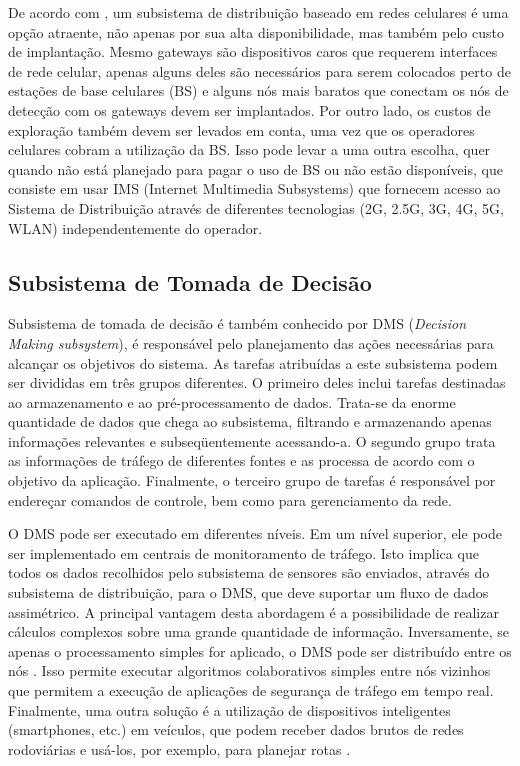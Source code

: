 \documentclass[
	12pt,				%
	oneside,			%
	a4paper,			%
	english,			%
	brazil				%
	]{abntex2ppgsi}
\begin{document}
De acordo com , um subsistema de distribuição baseado em redes celulares é uma opção atraente, não apenas por sua alta disponibilidade, mas também pelo custo de implantação. Mesmo gateways são dispositivos caros que requerem interfaces de rede celular, apenas alguns deles são necessários para serem colocados perto de estações de base celulares (BS) e alguns nós mais baratos que conectam os nós de detecção com os gateways devem ser implantados. Por outro lado, os custos de exploração também devem ser levados em conta, uma vez que os operadores celulares cobram a utilização da BS. Isso pode levar a uma outra escolha, quer quando não está planejado para pagar o uso de BS ou não estão disponíveis, que consiste em usar IMS (Internet Multimedia Subsystems) \cite{birk2009iroad} que fornecem acesso ao Sistema de Distribuição através de diferentes tecnologias (2G, 2.5G, 3G, 4G, 5G, WLAN) independentemente do operador.

\subsection{Subsistema de Tomada de Decisão}
Subsistema de tomada de decisão é também conhecido por DMS (\textit{Decision Making subsystem}), é responsável pelo planejamento das ações necessárias para alcançar os objetivos do sistema. As tarefas atribuídas a este subsistema podem ser divididas em três grupos diferentes. O primeiro deles inclui tarefas destinadas ao armazenamento e ao pré-processamento de dados. Trata-se da enorme quantidade de dados que chega ao subsistema, filtrando e armazenando apenas informações relevantes e subseqüentemente acessando-a. O segundo grupo trata as informações de tráfego de diferentes fontes e as processa de acordo com o objetivo da aplicação. Finalmente, o terceiro grupo de tarefas é responsável por endereçar comandos de controle, bem como para gerenciamento da rede.

O DMS pode ser executado em diferentes níveis. Em um nível superior, ele pode ser implementado em centrais de monitoramento de tráfego. Isto implica que todos os dados recolhidos pelo subsistema de sensores são enviados, através do subsistema de distribuição, para o DMS, que deve suportar um fluxo de dados assimétrico. A principal vantagem desta abordagem é a possibilidade de realizar cálculos complexos sobre uma grande quantidade de informação. Inversamente, se apenas o processamento simples for aplicado, o DMS pode ser distribuído entre os nós . Isso permite executar algoritmos colaborativos simples entre nós vizinhos que permitem a execução de aplicações de segurança de tráfego em tempo real. Finalmente, uma outra solução é a utilização de dispositivos inteligentes (smartphones, etc.) em veículos, que podem receber dados brutos de redes rodoviárias e usá-los, por exemplo, para planejar rotas \cite{losilla2011comprehensive}.
\end{document}
